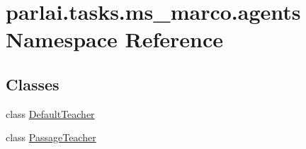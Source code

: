 \hypertarget{namespaceparlai_1_1tasks_1_1ms__marco_1_1agents}{}\section{parlai.\+tasks.\+ms\+\_\+marco.\+agents Namespace Reference}
\label{namespaceparlai_1_1tasks_1_1ms__marco_1_1agents}
\subsection*{Classes}
\begin{DoxyCompactItemize}
\item 
class \hyperlink{classparlai_1_1tasks_1_1ms__marco_1_1agents_1_1DefaultTeacher}{Default\+Teacher}
\item 
class \hyperlink{classparlai_1_1tasks_1_1ms__marco_1_1agents_1_1PassageTeacher}{Passage\+Teacher}
\end{DoxyCompactItemize}
